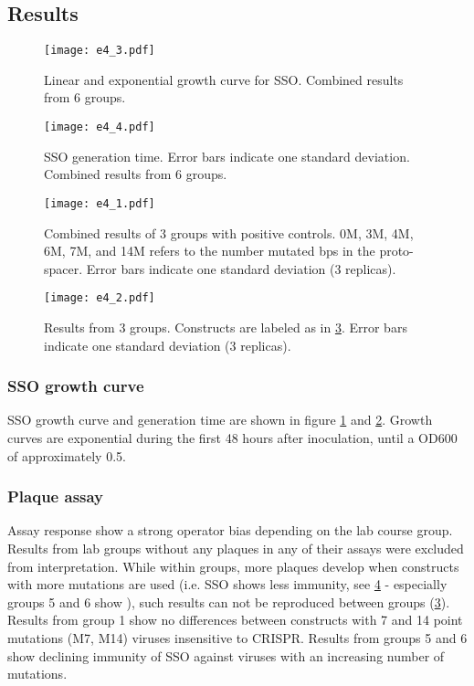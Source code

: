 \documentclass[a4paper,10pt]{article}
\begin{document}
\subsection{Results}

\begin{figure}[h!]
\begin{center}
\texttt{[image: e4\_3.pdf]}
\caption{Linear and exponential growth curve for SSO. Combined results from 6 groups. }
\label{e4_3}
\end{center}
\end{figure}

\begin{figure}[h!]
\begin{center}
\texttt{[image: e4\_4.pdf]}
\caption{SSO generation time. Error bars indicate one standard deviation. Combined results from 6 groups.}
\label{e4_4}
\end{center}
\end{figure}

\begin{figure}[h!]
\begin{center}
\texttt{[image: e4\_1.pdf]}
\caption{Combined results of 3 groups with positive controls. 0M, 3M, 4M, 6M, 7M, and 14M refers to the number mutated bps in the proto-spacer. Error bars indicate one standard deviation (3 replicas).}
\label{e4_1}
\end{center}
\end{figure}

\begin{figure}[h!]
\begin{center}
\texttt{[image: e4\_2.pdf]}
\caption{Results from 3 groups. Constructs are labeled as in \ref{e4_1}. Error bars indicate one standard deviation (3 replicas).}
\label{e4_2}
\end{center}
\end{figure}

\subsubsection{SSO growth curve}
SSO growth curve and generation time are shown in figure \ref{e4_3} and \ref{e4_4}. Growth curves are exponential during the first 48 hours after inoculation, until a OD600 of approximately 0.5.
\subsubsection{Plaque assay}
Assay response show a strong operator bias depending on the lab course group. Results from lab groups without any plaques in any of their assays were excluded from interpretation. While within groups, more plaques develop when constructs with more mutations are used (i.e. SSO shows less immunity, see \ref{e4_2} - especially groups 5 and 6 show ), such results can not be reproduced between groups (\ref{e4_1}). Results from group 1 show no differences between constructs with 7 and 14 point mutations (M7, M14) viruses insensitive to CRISPR. Results from groups 5 and 6 show declining immunity of SSO against viruses with an increasing number of mutations. 
\end{document}
